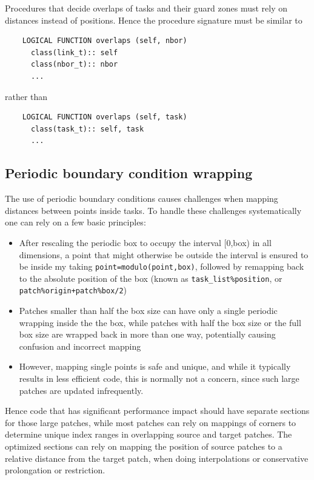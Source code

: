 \documentclass[paper=a4,fontsize=11pt]{scrartcl}
\numberwithin{equation}{section}		%
\numberwithin{figure}{section}			%
\numberwithin{table}{section}				%
\newcommand{\codecolor}{\color{Blue}}
\begin{document}
Procedures that decide overlaps of tasks and their guard zones must rely on distances instead of positions.  Hence the procedure signature must be similar to
{\codecolor \begin{verbatim}
    LOGICAL FUNCTION overlaps (self, nbor)
      class(link_t):: self
      class(nbor_t):: nbor
      ...
\end{verbatim}}
rather than
{\codecolor \begin{verbatim}
    LOGICAL FUNCTION overlaps (self, task)
      class(task_t):: self, task
      ...
\end{verbatim}}

\subsection{Periodic boundary condition wrapping}
The use of periodic boundary conditions causes challenges when mapping distances between points inside tasks.  To handle these challenges systematically one can rely on a few basic principles:
\begin{itemize}
    \item After rescaling the periodic box to occupy the interval [0,box) in all dimensions, a point that might otherwise be outside the interval is ensured to be inside my taking \verb|point=modulo(point,box)|, followed by remapping back to the absolute position of the box (known as \verb|task_list%position|, or \verb|patch%origin+patch%box/2|)
    \item Patches smaller than half the box size can have only a single periodic wrapping inside the the box, while patches with half the box size or the full box size are wrapped back in more than one way, potentially causing confusion and incorrect mapping
    \item However, mapping single points is safe and unique, and while it typically results in less efficient code, this is normally not a concern, since such large patches are updated infrequently.
\end{itemize}
Hence code that has significant performance impact should have separate sections for those large patches, while most patches can rely on mappings of corners to determine unique index ranges in overlapping source and target patches.  The optimized sections can rely on mapping the position of source patches to a relative distance from the target patch, when doing interpolations or conservative prolongation or restriction.
\end{document}
